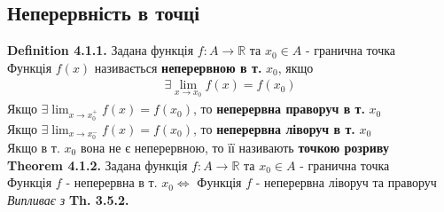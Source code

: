 \documentclass[a4paper, 14pt]{extarticle}
\def\huge{\displaystyle}
\def\bigline{\vspace{5mm}\\}
\def\defin#1{\textbf{Definition {#1}}}
\def\th#1{\textbf{Theorem {#1}}}
\def\bigline{\vspace{5mm}\\}
\begin{document}
\subsection{Неперервність в точці}
\defin{4.1.1.} Задана функція $f: A \to \mathbb{R}$ та $x_0 \in A$ - гранична точка\\
Функція $f(x)$ називається \textbf{неперервною в т.} $x_0$, якщо
\begin{align*}
\exists \lim_{x \to x_0} f(x) = f(x_0)
\end{align*}
Якщо $\huge \exists \lim_{x \to x_0^+} f(x) = f(x_0)$, то \textbf{неперервна праворуч в т.} $x_0$\\
Якщо $\huge \exists \lim_{x \to x_0^-} f(x) = f(x_0)$, то \textbf{неперервна ліворуч в т.} $x_0$\\
Якщо в т. $x_0$ вона не є неперервною, то її називають \textbf{точкою розриву}
\bigline
\th{4.1.2.} Задана функція $f: A \to \mathbb{R}$ та $x_0 \in A$ - гранична точка\\
Функція $f$ - неперервна в т. $x_0 \iff$ Функція $f$ - неперервна ліворуч та праворуч\\
\textit{Випливає з} \textbf{Th. 3.5.2.}
\bigline
\end{document}

